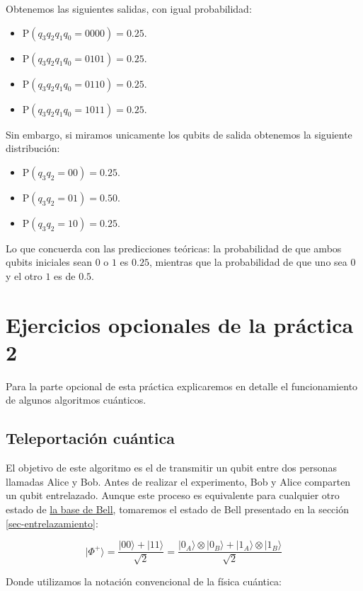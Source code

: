 \documentclass[11pt]{article}
\newcommand{\ra}{\rangle}
\theoremstyle{plain}
\begin{document}
Obtenemos las siguientes salidas, con igual probabilidad:

\begin{itemize}
	\item P$(q_3q_2q_1q_0 = 0000) = 0.25$.
	\item P$(q_3q_2q_1q_0 = 0101) = 0.25$.
	\item P$(q_3q_2q_1q_0 = 0110) = 0.25$.
	\item P$(q_3q_2q_1q_0 = 1011) = 0.25$.
\end{itemize}

Sin embargo, si miramos unicamente los qubits de salida obtenemos la siguiente distribución:

\begin{itemize}
	\item P$(q_3q_2 = 00) = 0.25$.
	\item P$(q_3q_2 = 01) = 0.50$.
	\item P$(q_3q_2 = 10) = 0.25$.
\end{itemize}

Lo que concuerda con las predicciones teóricas: la probabilidad de que ambos qubits iniciales sean $0$ o $1$ es $0.25$, mientras que la probabilidad de que uno sea $0$ y el otro $1$ es de $0.5$.


\section{Ejercicios opcionales de la práctica 2}

Para la parte opcional de esta práctica explicaremos en detalle el funcionamiento de algunos algoritmos cuánticos.


\subsection{Teleportación cuántica}


El objetivo de este algoritmo es el de transmitir un qubit entre dos personas llamadas Alice y Bob. Antes de realizar el experimento, Bob y Alice comparten un qubit entrelazado. Aunque este proceso es equivalente para cualquier otro estado de \href{https://es.wikipedia.org/wiki/Base_de_Bell}{la base de Bell}, tomaremos el estado de Bell presentado en la sección \ref{sec-entrelazamiento}:

\[
	|\Phi^+\ra = \frac{|00\ra + |11\ra}{\sqrt 2} = \frac{|0_A\ra \otimes |0_B\ra + |1_A\ra \otimes |1_B\ra}{\sqrt 2}
\]

Donde utilizamos la notación convencional de la física cuántica:
\end{document}
